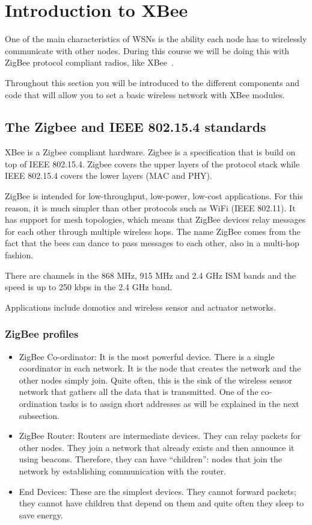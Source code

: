 \chapter{Introduction to XBee}\label{introToXBee}


One of the main characteristics of WSNs is the ability each node has to wirelessly communicate with other nodes. 
During this course we will be doing this with ZigBee protocol compliant radios, like XBee~\cite{faludi2010bws}.

Throughout this section you will be introduced to the different components and code that will allow you to set a basic wireless network with XBee modules.

\section{The Zigbee and IEEE 802.15.4 standards}

XBee is a Zigbee compliant hardware.
Zigbee is a specification that is build on top of IEEE 802.15.4.
Zigbee covers the upper layers of the protocol stack while IEEE 802.15.4 covers the lower layers (MAC and PHY).

ZigBee is intended for low-throughput, low-power, low-cost applications. For this reason, it is much simpler than other protocols such as WiFi (IEEE 802.11).
It has support for mesh topologies, which means that ZigBee devices relay messages for each other through multiple wireless hops.
The name ZigBee comes from the fact that the bees can dance to pass messages to each other, also in a multi-hop fashion.

There are channels in the 868 MHz, 915 MHz and 2.4 GHz ISM bands and the speed is up to 250 kbps in the 2.4 GHz band.

Applications include domotics and wireless sensor and actuator networks.

\subsection{ZigBee profiles}
\begin{itemize}
	\item ZigBee Co-ordinator: It is the most powerful device. There is a single coordinator in each network.
	It is the node that creates the network and the other nodes simply join.
	Quite often, this is the sink of the wireless sensor network that gathers all the data that is transmitted.
	One of the co-ordination tasks is to assign short addresses as will be explained in the next subsection.
	\item ZigBee Router: Routers are intermediate devices.
	They can relay packets for other nodes.
	They join a network that already exists and then announce it using beacons.
	Therefore, they can have ``children'': nodes that join the network by establishing communication with the router.
	\item End Devices:
	These are the simplest devices.
	They cannot forward packets; they cannot have children that depend on them and quite often they sleep to save energy.
\end{itemize}

